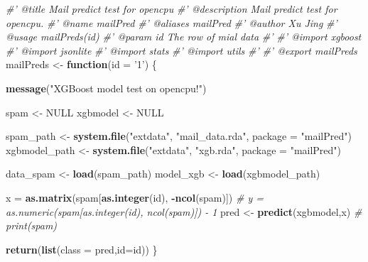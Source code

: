 \documentclass[]{book}
\newenvironment{Shaded}{\begin{snugshade}}{\end{snugshade}}
\newcommand{\KeywordTok}[1]{\textcolor[rgb]{0.13,0.29,0.53}{\textbf{#1}}}
\newcommand{\DataTypeTok}[1]{\textcolor[rgb]{0.13,0.29,0.53}{#1}}
\newcommand{\StringTok}[1]{\textcolor[rgb]{0.31,0.60,0.02}{#1}}
\newcommand{\CommentTok}[1]{\textcolor[rgb]{0.56,0.35,0.01}{\textit{#1}}}
\newcommand{\OtherTok}[1]{\textcolor[rgb]{0.56,0.35,0.01}{#1}}
\newcommand{\ControlFlowTok}[1]{\textcolor[rgb]{0.13,0.29,0.53}{\textbf{#1}}}
\newcommand{\OperatorTok}[1]{\textcolor[rgb]{0.81,0.36,0.00}{\textbf{#1}}}
\newcommand{\NormalTok}[1]{#1}
\begin{document}
\begin{Shaded}
\begin{Highlighting}[]
\CommentTok{#' @title Mail predict test for opencpu}
\CommentTok{#' @description Mail predict test for opencpu.}
\CommentTok{#' @name mailPred}
\CommentTok{#' @aliases mailPred}
\CommentTok{#' @author Xu Jing}
\CommentTok{#' @usage mailPreds(id)}
\CommentTok{#' @param id The row of mial data}
\CommentTok{#'}
\CommentTok{#' @import xgboost}
\CommentTok{#' @import jsonlite}
\CommentTok{#' @import stats}
\CommentTok{#' @import utils}
\CommentTok{#'}
\CommentTok{#' @export mailPreds}
\NormalTok{mailPreds <-}\StringTok{ }\ControlFlowTok{function}\NormalTok{(}\DataTypeTok{id =} \StringTok{'1'}\NormalTok{) \{}

  \KeywordTok{message}\NormalTok{(}\StringTok{"XGBoost model test on opencpu!"}\NormalTok{)}

\NormalTok{  spam <-}\StringTok{ }\OtherTok{NULL}
\NormalTok{  xgbmodel <-}\StringTok{ }\OtherTok{NULL}

\NormalTok{  spam_path <-}\StringTok{ }\KeywordTok{system.file}\NormalTok{(}\StringTok{"extdata"}\NormalTok{, }\StringTok{"mail_data.rda"}\NormalTok{, }\DataTypeTok{package =} \StringTok{"mailPred"}\NormalTok{)}
\NormalTok{  xgbmodel_path <-}\StringTok{ }\KeywordTok{system.file}\NormalTok{(}\StringTok{"extdata"}\NormalTok{, }\StringTok{"xgb.rda"}\NormalTok{, }\DataTypeTok{package =} \StringTok{"mailPred"}\NormalTok{)}

\NormalTok{  data_spam <-}\StringTok{ }\KeywordTok{load}\NormalTok{(spam_path)}
\NormalTok{  model_xgb <-}\StringTok{ }\KeywordTok{load}\NormalTok{(xgbmodel_path)}

\NormalTok{  x =}\StringTok{ }\KeywordTok{as.matrix}\NormalTok{(spam[}\KeywordTok{as.integer}\NormalTok{(id), }\OperatorTok{-}\KeywordTok{ncol}\NormalTok{(spam)])}
  \CommentTok{# y = as.numeric(spam[as.integer(id), ncol(spam)]) - 1}
\NormalTok{  pred <-}\StringTok{ }\KeywordTok{predict}\NormalTok{(xgbmodel,x)}
  \CommentTok{# print(spam)}

  \KeywordTok{return}\NormalTok{(}\KeywordTok{list}\NormalTok{(}\DataTypeTok{class =}\NormalTok{ pred,}\DataTypeTok{id=}\NormalTok{id))}
\NormalTok{\}}
\end{Highlighting}
\end{Shaded}
\end{document}
